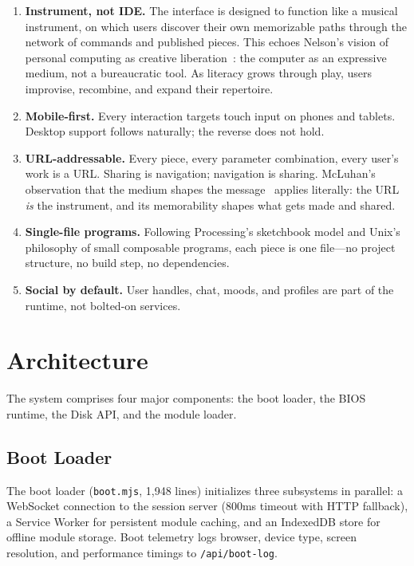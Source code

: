 \documentclass[10pt,letterpaper,twocolumn]{article}
\begin{document}
\begin{enumerate}
  \item \textbf{Instrument, not IDE.} The interface is designed to function like a musical instrument, on which users discover their own memorizable paths through the network of commands and published pieces. This echoes Nelson's vision of personal computing as creative liberation~\citep{nelson1974computerlib}: the computer as an expressive medium, not a bureaucratic tool. As literacy grows through play, users improvise, recombine, and expand their repertoire.
  \item \textbf{Mobile-first.} Every interaction targets touch input on phones and tablets. Desktop support follows naturally; the reverse does not hold.
  \item \textbf{URL-addressable.} Every piece, every parameter combination, every user's work is a URL. Sharing is navigation; navigation is sharing. McLuhan's observation that the medium shapes the message~\citep{mcluhan1964understanding} applies literally: the URL \emph{is} the instrument, and its memorability shapes what gets made and shared.
  \item \textbf{Single-file programs.} Following Processing's sketchbook model and Unix's philosophy of small composable programs, each piece is one file---no project structure, no build step, no dependencies.
  \item \textbf{Social by default.} User handles, chat, moods, and profiles are part of the runtime, not bolted-on services.
\end{enumerate}


\section{Architecture}
\label{sec:architecture}

The system comprises four major components: the boot loader, the BIOS runtime, the Disk API, and the module loader.

\subsection{Boot Loader}

The boot loader (\texttt{boot.mjs}, 1,948 lines) initializes three subsystems in parallel: a WebSocket connection to the session server (800ms timeout with HTTP fallback), a Service Worker for persistent module caching, and an IndexedDB store for offline module storage. Boot telemetry logs browser, device type, screen resolution, and performance timings to \texttt{/api/boot-log}.
\end{document}
